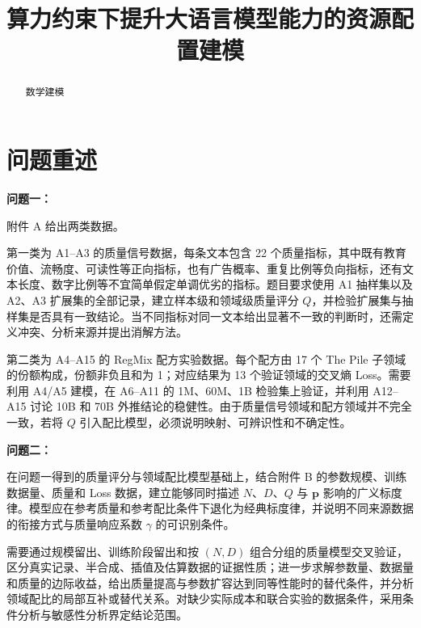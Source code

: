\documentclass[bwprint]{gmcmthesis}
\title{算力约束下提升大语言模型能力的资源配置建模}   %
\begin{document}
\maketitle


\begin{abstract}    %
    数学建模
\end{abstract}

\pagestyle{plain}

\tableofcontents    %


\section{问题重述}  %
\textbf{问题一：}

附件 A 给出两类数据。

第一类为 A1--A3 的质量信号数据，每条文本包含 22 个质量指标，其中既有教育价值、流畅度、可读性等正向指标，也有广告概率、重复比例等负向指标，还有文本长度、数字比例等不宜简单假定单调优劣的指标。题目要求使用 A1 抽样集以及 A2、A3 扩展集的全部记录，建立样本级和领域级质量评分 $Q$，并检验扩展集与抽样集是否具有一致结论。当不同指标对同一文本给出显著不一致的判断时，还需定义冲突、分析来源并提出消解方法。

第二类为 A4--A15 的 RegMix 配方实验数据。每个配方由 17 个 The Pile 子领域的份额构成，份额非负且和为 1；对应结果为 13 个验证领域的交叉熵 Loss。需要利用 A4/A5 建模，在 A6--A11 的 1M、60M、1B 检验集上验证，并利用 A12--A15 讨论 10B 和 70B 外推结论的稳健性。由于质量信号领域和配方领域并不完全一致，若将 $Q$ 引入配比模型，必须说明映射、可辨识性和不确定性。

\textbf{问题二：}

在问题一得到的质量评分与领域配比模型基础上，结合附件 B 的参数规模、训练数据量、质量和 Loss 数据，建立能够同时描述 $N$、$D$、$Q$ 与 $\bm p$ 影响的广义标度律。模型应在参考质量和参考配比条件下退化为经典标度律，并说明不同来源数据的衔接方式与质量响应系数 $\gamma$ 的可识别条件。

需要通过规模留出、训练阶段留出和按 \((N,D)\) 组合分组的质量模型交叉验证，区分真实记录、半合成、插值及估算数据的证据性质；进一步求解参数量、数据量和质量的边际收益，给出质量提高与参数扩容达到同等性能时的替代条件，并分析领域配比的局部互补或替代关系。对缺少实际成本和联合实验的数据条件，采用条件分析与敏感性分析界定结论范围。
\end{document}
